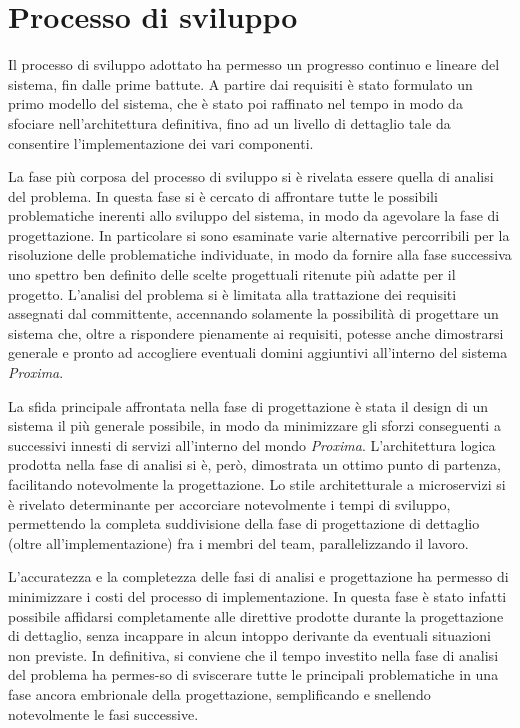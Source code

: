 \documentclass[a4paper,12pt]{report}
\begin{document}
\section{Processo di sviluppo}
Il processo di sviluppo adottato ha permesso un progresso continuo e lineare del sistema, fin dalle prime battute. A partire dai requisiti è stato formulato un primo modello del sistema, che è stato poi raffinato nel tempo in modo da sfociare nell'architettura definitiva, fino ad un livello di dettaglio tale da consentire l'implementazione dei vari componenti. 

La fase più corposa del processo di sviluppo si è rivelata essere quella di analisi del problema. In questa fase si è cercato di affrontare tutte le possibili problematiche inerenti allo sviluppo del sistema, in modo da agevolare la fase di progettazione. In particolare si sono esaminate varie alternative percorribili per la risoluzione delle problematiche individuate, in modo da fornire alla fase successiva uno spettro ben definito delle scelte progettuali ritenute più adatte per il progetto. L'analisi del problema si è limitata alla trattazione dei requisiti assegnati dal committente, accennando solamente la possibilità di progettare un sistema che, oltre a rispondere pienamente ai requisiti, potesse anche dimostrarsi generale e pronto ad accogliere eventuali domini aggiuntivi all'interno del sistema \emph{Proxima}. 

La sfida principale affrontata nella fase di progettazione è stata il design di un sistema il più generale possibile, in modo da minimizzare gli sforzi conseguenti a successivi innesti di servizi all'interno del mondo \emph{Proxima}. L'architettura logica prodotta nella fase di analisi si è, però, dimostrata un ottimo punto di partenza, facilitando notevolmente la progettazione. Lo stile architetturale a microservizi si è rivelato determinante per accorciare notevolmente i tempi di sviluppo, permettendo la completa suddivisione della fase di progettazione di dettaglio (oltre all'implementazione) fra i membri del team, parallelizzando il lavoro.

L'accuratezza e la completezza delle fasi di analisi e progettazione ha permesso di minimizzare i costi del processo di implementazione. In questa fase è stato infatti possibile affidarsi completamente alle direttive prodotte durante la progettazione di dettaglio, senza incappare in alcun intoppo derivante da eventuali situazioni non previste. In definitiva, si conviene che il tempo investito nella fase di analisi del problema ha permes-so di sviscerare tutte le principali problematiche in una fase ancora embrionale della progettazione, semplificando e snellendo notevolmente le fasi successive.
\end{document}
